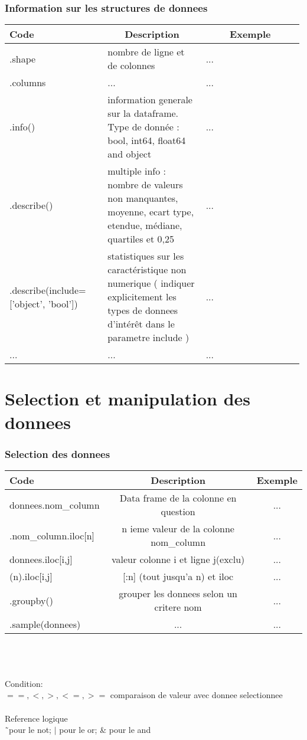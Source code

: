 \documentclass{article}
\begin{document}
    \section*{Information sur les structures de donnees}
    \begin{tabular}{|p{0.33\linewidth}|p{0.33\linewidth}|p{0.33\linewidth}|}
	\hline
	\multicolumn{1}{|l|}{Code} &
	\multicolumn{1}{c|}{Description} &
	\multicolumn{1}{c|}{Exemple} \\ \hline
	.shape & nombre de ligne et de colonnes & ... \\ \hline
	.columns & ... & ...  \\ \hline
	.info() & information generale sur la dataframe. Type de donnée : bool, int64, float64 and object & ...  \\ \hline
	.describe() & multiple info : 
nombre de valeurs non manquantes, moyenne, ecart type, etendue, médiane, quartiles et 0,25 & ...  \\ \hline
	.describe(include= ['object', 'bool']) & statistiques sur les caractéristique non numerique ( indiquer explicitement les types de donnees d'intérêt dans le parametre include ) & ...  \\ \hline  
	... & ... & ... \\ 
	\hline
	\end{tabular}
	
    \part*{Selection et manipulation des donnees}
    
    \section*{Selection des donnees}
	\begin{tabular}{|l|c|c|}
	\hline
	\multicolumn{1}{|l|}{Code} &
	\multicolumn{1}{c|}{Description} &
	\multicolumn{1}{c|}{Exemple} \\ \hline
	donnees.nom\_column & Data frame de la colonne en question & ... \\ \hline
	.nom\_column.iloc[n] & n ieme valeur de la colonne nom\_column  & ...  \\ \hline
	donnees.iloc[i,j] & valeur colonne i et ligne j(exclu)  & ... \\ \hline
	(n).iloc[i,j] & [:n] (tout jusqu'a n) et iloc & ...  \\ \hline
	.groupby() & grouper les donnees selon un critere nom & ...  \\ \hline
	.sample(donnees) & ... & ... \\ \hline
	\hline
	\end{tabular}
	\\ \\\\
    Condition:\\
    \texttt{$==,<,>,<=,>=$} comparaison de valeur avec donnee selectionnee
	\\ \\
	Reference logique
	\\
    \~\ pour le not;	\texttt{$|$} pour le or;	\& pour le and\\
\end{document}
